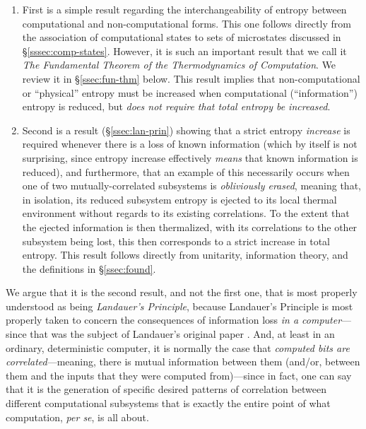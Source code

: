 \documentclass[preprints,article,accept,moreauthors,pdftex]{Definitions/mdpi}
\begin{document}
\begin{paracol}{2}
\begin{enumerate}
    \item First is a simple result regarding the interchangeability of entropy between computational and non-computational forms. This one follows directly from the association of computational states to sets of microstates discussed in \S\ref{sssec:comp-states}. However, it is such an important result that we call it \emph{The Fundamental Theorem of the Thermodynamics of Computation}. We review it in \S\ref{ssec:fun-thm} below. This result implies that non-computational or ``physical'' entropy must be increased when computational (``information'') entropy is reduced, but {\em does not require that total entropy be increased}. 

    \item Second is a result (\S\ref{ssec:lan-prin}) showing that a strict entropy \emph{increase} is required whenever there is a loss of known information (which by itself is not surprising, since entropy increase effectively \emph{means} that known information is reduced), and furthermore, that an example of this necessarily occurs when one of two mutually-correlated subsystems is \emph{obliviously erased}, meaning that, in isolation, its reduced subsystem entropy is ejected to its local thermal environment without regards to its existing correlations. To the extent that the ejected information is then thermalized, with its correlations to the other subsystem being lost, this then corresponds to a strict increase in total entropy. This result follows directly from unitarity, information theory, and the definitions in \S\ref{ssec:found}.

\end{enumerate}

We argue that it is the second result, and not the first one, that is most properly understood as being \textit{Landauer's Principle}, because Landauer's Principle is most properly taken to concern the consequences of information loss \emph{in a computer}---since that was the subject of Landauer's original paper \cite{Lan61}. And, at least in an ordinary, deterministic computer, it is normally the case that \emph{computed bits are correlated}---meaning, there is mutual information between them (and/or, between them and the inputs that they were computed from)---since in fact, one can say that it is the generation of specific desired patterns of correlation between different computational subsystems that is exactly the entire point of what computation, \textit{per se}, is all about.


\end{paracol}
\end{document}
